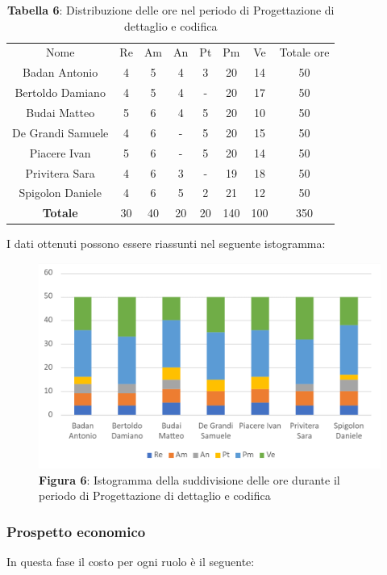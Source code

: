 \begin{table}[H]
	\centering
	\renewcommand{\arraystretch}{1.5}
	\begin{tabular}{|c|c|c|c|c|c|c|c|}
		\hline
		\rowcolor{lighter-grayer}
		Nome & Re & Am & An & Pt & Pm & Ve & Totale ore\\
Badan Antonio     & 4  & 5  & 4  & 3  & 20  & 14  & 50  \\ \hline
Bertoldo Damiano  & 4  & 5  & 4  & - & 20  & 17  & 50  \\ \hline
Budai Matteo      & 5  & 6  & 4  & 5  & 20  & 10  & 50  \\ \hline
De Grandi Samuele & 4  & 6  & - & 5  & 20  & 15  & 50  \\ \hline
Piacere Ivan      & 5  & 6  & - & 5  & 20  & 14  & 50  \\ \hline
Privitera Sara    & 4  & 6  & 3  & - & 19  & 18  & 50  \\ \hline
Spigolon Daniele  & 4  & 6  & 5  & 2  & 21  & 12  & 50  \\ \hline
\textbf{Totale}   & 30 & 40 & 20 & 20 & 140 & 100 & 350 \\ \hline
	\end{tabular}
	\caption*{\textbf{Tabella 6}: Distribuzione delle ore nel periodo di Progettazione di dettaglio e codifica\\}
\end{table}	
I dati ottenuti possono essere riassunti nel seguente istogramma:

\begin{figure}[H]
	\centering
	\includegraphics[width=0.7\linewidth]{res/images/IstogrammaFase3.png}
	\caption*{\textbf{Figura 6}: Istogramma della suddivisione delle ore durante il periodo di Progettazione di dettaglio e codifica}
	\label{fig:Figura10}
\end{figure}


\subsubsection{Prospetto economico}
In questa fase il costo per ogni ruolo è il seguente:

